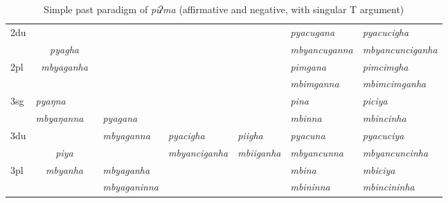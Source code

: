\begin{landscape}
\begin{table}[p]
{{\begin{tabular}{|l||p{2.4cm}|p{1.5cm}|p{2.4cm}|p{2.4cm}|p{2.4cm}|p{3.2cm}|p{3.2cm}|}
{\sc 2du}		& 	\multicolumn{2}{c|}{}     &  \multicolumn{3}{c|}{\cellcolor[gray]{.8}} & \it  pyacugana  & \it   pyacucigha \\
		&  	\multicolumn{2}{c|}{\it  pyagha} &   \multicolumn{3}{c|}{\cellcolor[gray]{.8}}& \it mbyancuganna  & \it  mbyancunciganha \\
 \cline{1-1} \cline{7-8}			
{\sc 2pl}	& 	\multicolumn{2}{c|}{\it mbyaganha} &   \multicolumn{3}{c|}{ \cellcolor[gray]{.8}}& \it  pimgana& \it  pimcimgha  \\
		&  	\multicolumn{2}{c|}{ }&   \multicolumn{3}{c|}{\cellcolor[gray]{.8} }& \it  mbimganna & \it  mbimcimganha \\
\hline			
{\sc 3sg}	& \it pyaŋna	  & \it 	      	& \it   			& \it     & \it     	& \it pina& \it piciya\\
		& \it  mbyaŋanna   & \it    	& \it  pyagana& \it   & \it    & \it mbinna& \it mbincinha\\
  \cline{1-2}  \cline{7-8}					
{\sc 3du}		&   \multicolumn{2}{c|}{}& \it mbyaganna& \it pyacigha & \it    piigha& \it   pyacuna & \it   pyacuciya\\
		&   \multicolumn{2}{c|}{\it piya}& \it   		& \it 		mbyanciganha	& \it  mbiiganha & \it  mbyancunna & \it  mbyancuncinha\\
 \cline{1-1} \cline{4-4} \cline{7-8}	
{\sc 3pl}		&\multicolumn{2}{c|}{\it mbyanha}& \it mbyaganha& \it & \it  & \it mbina& \it mbiciya\\	
	& \multicolumn{2}{c|}{ }& \it mbyaganinna& \it  & \it  & \it mbininna& \it mbincininha \\
\hline
\end{tabular}
}
}
\caption{Simple past paradigm of \emph{piʔma}  (affirmative and negative, with singular T argument)}\label{par-pipma-pst}
\end{table}




\end{landscape}
